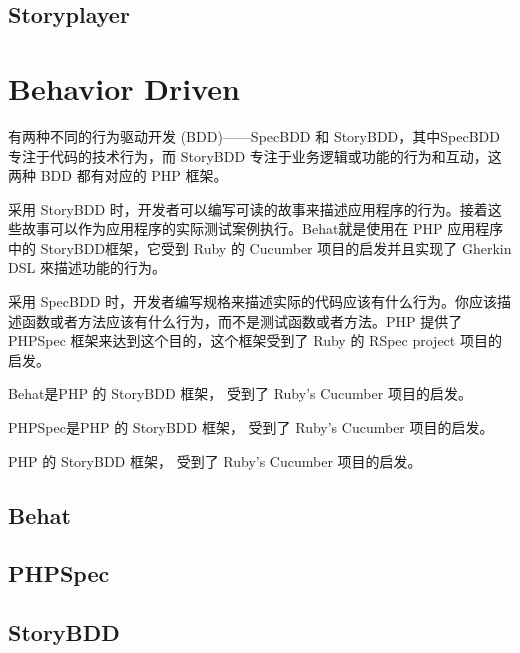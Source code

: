 \subsection{Storyplayer}




\section{Behavior Driven}

有两种不同的行为驱动开发 (BDD)——SpecBDD 和 StoryBDD，其中SpecBDD 专注于代码的技术行为，而 StoryBDD 专注于业务逻辑或功能的行为和互动，这两种 BDD 都有对应的 PHP 框架。


采用 StoryBDD 时，开发者可以编写可读的故事来描述应用程序的行为。接着这些故事可以作为应用程序的实际测试案例执行。Behat就是使用在 PHP 应用程序中的 StoryBDD框架，它受到 Ruby 的 Cucumber 项目的启发并且实现了 Gherkin DSL 來描述功能的行为。


采用 SpecBDD 时，开发者编写规格来描述实际的代码应该有什么行为。你应该描述函数或者方法应该有什么行为，而不是测试函数或者方法。PHP 提供了 PHPSpec 框架来达到这个目的，这个框架受到了 Ruby 的 RSpec project 项目的启发。

\begin{compactitem}
\item Behat是PHP 的 StoryBDD 框架， 受到了 Ruby’s Cucumber 项目的启发。
\item PHPSpec是PHP 的 StoryBDD 框架， 受到了 Ruby’s Cucumber 项目的启发。
\item PHP 的 StoryBDD 框架， 受到了 Ruby’s Cucumber 项目的启发。
\end{compactitem}


\subsection{Behat}


\subsection{PHPSpec}


\subsection{StoryBDD}




























